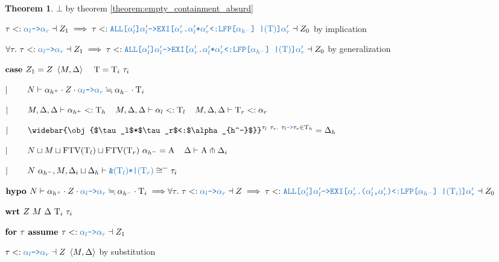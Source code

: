 \documentclass[acmsmall]{acmart}
\theoremstyle{definition}
\newtheorem{theorem}{Theorem}[section]
\begin{document}
\begin{theorem}
        \item \Z\Z\Z\Z $\bot$ by theorem \ref{theorem:empty_containment_absurd}
      \item \Z\Z\Z $
        \tau \subtypes \obj{$\alpha_l$->$\alpha_r$} \given Z_1
        \implies
        \tau
        \subtypes
        \obj{ALL[$\alpha_l'$]$\alpha_l'$->EXI[$\alpha_r'$.$\alpha_l'$*$\alpha_r'$<:LFP[$\alpha_{h^-}$] |$(\Tau)$]$\alpha_r'$} 
        \given Z_0
      $ by implication
    \item \Z\Z $
      \forall \tau .\ 
      \tau \subtypes \obj{$\alpha_l$->$\alpha_r$} \given Z_1
      \implies
      \tau
      \subtypes
      \obj{ALL[$\alpha_l'$]$\alpha_l'$->EXI[$\alpha_r'$.$\alpha_l'$*$\alpha_r'$<:LFP[$\alpha_{h^-}$] |$(\Tau)$]$\alpha_r'$} 
      \given Z_0
    $ by generalization 
  \item \Z $\B{case }
    Z_1 = Z\ \left<M, \Delta \right> \I \Tau = \Tau_i\ \tau_i
  $
  \item \Z $\contin
    N \entails 
    \alpha_{h^+} \cdot Z \cdot \obj{$\alpha_l$->$\alpha_r$} 
    \fallingdotseq 
    \alpha_{h^-} \cdot \Tau_i
  $
  \item \Z $|\ \ \ \ \ \ \ 
    M, \Delta, \Delta \vdash \alpha_{h^+} <: \mathrm{T}_h
    \hspace{4mm}
    M, \Delta, \Delta \vdash \alpha_l <: \mathrm{T}_l 
    \hspace{4mm}
    M, \Delta, \Delta \vdash \mathrm{T}_r <: \alpha_r
  $
  \item \Z $\contin
    \widebar{\obj{$\tau_l$*$\tau_r$<:$\alpha_{h^-}$}}^{\tau_l\ \tau_r .\ \tau_l\obj{->}\tau_r \in \Tau_h} = \Delta_h
  $
  \item \Z $\contin
    N \sqcup M \sqcup \text{FTV}(\Tau_l) \sqcup \text{FTV}(\Tau_r)\ \alpha_{h^-} = \Alpha 
    \I
    \Delta \entails \Alpha \pitchfork \Delta_i  
  $
  \item \Z $\contin
    N\ \alpha_{h^-}, M, \Delta_i \sqcup \Delta_h \entails \obj{\&$(\Tau_l)$*|$(\Tau_r)$} \cong^{-} \tau_i
  $
  \item \Z $\B{hypo }
    N \entails 
    \alpha_{h^+} \cdot Z \cdot \obj{$\alpha_l$->$\alpha_r$} 
    \fallingdotseq 
    \alpha_{h^-} \cdot \Tau_i
    \implies
    \\
    \forall \tau .\ 
    \tau \subtypes \obj{$\alpha_l$->$\alpha_r$} \given Z
    \implies
    \tau
    \subtypes
    \obj{ALL[$\alpha_l'$]$\alpha_l'$->EXI[$\alpha_r'$.($\alpha_l'$,$\alpha_r'$)<:LFP[$\alpha_{h^-}$] |$(\Tau_i)$]$\alpha_r'$} 
    \given Z_0
  $
  \item \Z $\textbf{wrt }
    Z\ M\ \Delta\ \mathrm{T}_i\ \tau_i
  $

    \item \Z\Z $\B{for } \tau \B{ assume }
      \tau \subtypes \obj{$\alpha_l$->$\alpha_r$} \given Z_1
    $
      \item \Z\Z\Z $
        \tau \subtypes \obj{$\alpha_l$->$\alpha_r$} \given Z\ \left<M, \Delta\right>
      $ by substitution


\end{theorem}
\end{document}
